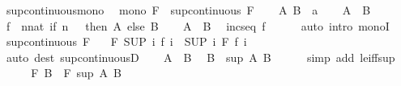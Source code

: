 \begin{isabellebody}
\endisatagproof
{\isafoldproof}%
%
\isadelimproof
\isanewline
%
\endisadelimproof
\isanewline
{}\isamarkupfalse%
\ sup{\isacharunderscore}continuous{\isacharunderscore}mono{\isacharcolon}\isanewline
\ \ {\isachardoublequoteopen}mono\ F{\isachardoublequoteclose}\ \ {\isachardoublequoteopen}sup{\isacharunderscore}continuous\ F{\isachardoublequoteclose}\isanewline
%
\isadelimproof
%
\endisadelimproof
%
\isatagproof
{}\isamarkupfalse%
\isanewline
\ \ \isamarkupfalse%
\ A\ B\ {\isacharcolon}{\isacharcolon}\ {\isachardoublequoteopen}{\isacharprime}a{\isachardoublequoteclose}\isanewline
\ \ \isamarkupfalse%
\ {\isachardoublequoteopen}A\ {\isasymle}\ B{\isachardoublequoteclose}\isanewline
\ \ \isamarkupfalse%
\ {\isacharquery}f\ {\isacharequal}\ {\isachardoublequoteopen}{\isasymlambda}n{\isacharcolon}{\isacharcolon}nat{\isachardot}\ if\ n\ {\isacharequal}\ {}\ then\ A\ else\ B{\isachardoublequoteclose}\isanewline
\ \ \isamarkupfalse%
\ {\isacartoucheopen}A\ {\isasymle}\ B{\isacartoucheclose}\ \isamarkupfalse%
\ {\isachardoublequoteopen}incseq\ {\isacharquery}f{\isachardoublequoteclose}\isanewline
\ \ \ \ \isamarkupfalse%
\ {\isacharparenleft}auto\ intro{\isacharcolon}\ monoI{\isacharparenright}\isanewline
\ \ \isamarkupfalse%
\ {\isacartoucheopen}sup{\isacharunderscore}continuous\ F{\isacartoucheclose}\ \isamarkupfalse%
\ {\isacharasterisk}{\isacharcolon}\ {\isachardoublequoteopen}F\ {\isacharparenleft}SUP\ i{\isachardot}\ {\isacharquery}f\ i{\isacharparenright}\ {\isacharequal}\ {\isacharparenleft}SUP\ i{\isachardot}\ F\ {\isacharparenleft}{\isacharquery}f\ i{\isacharparenright}{\isacharparenright}{\isachardoublequoteclose}\isanewline
\ \ \ \ \isamarkupfalse%
\ {\isacharparenleft}auto\ dest{\isacharcolon}\ sup{\isacharunderscore}continuousD{\isacharparenright}\isanewline
\ \ \isamarkupfalse%
\ {\isacartoucheopen}A\ {\isasymle}\ B{\isacartoucheclose}\ \isamarkupfalse%
\ {\isachardoublequoteopen}B\ {\isacharequal}\ sup\ A\ B{\isachardoublequoteclose}\isanewline
\ \ \ \ \isamarkupfalse%
\ {\isacharparenleft}simp\ add{\isacharcolon}\ le{\isacharunderscore}iff{\isacharunderscore}sup{\isacharparenright}\isanewline
\ \ \isamarkupfalse%
\ \isamarkupfalse%
\ {\isachardoublequoteopen}F\ B\ {\isacharequal}\ F\ {\isacharparenleft}sup\ A\ B{\isacharparenright}{\isachardoublequoteclose}\isanewline

\end{isabellebody}
